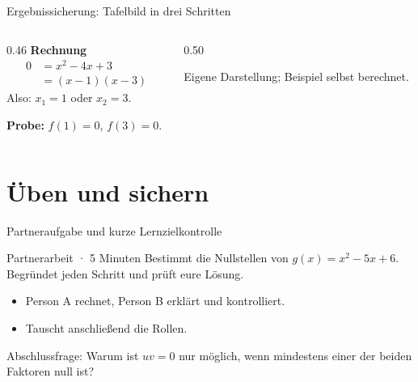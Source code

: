 \documentclass[aspectratio=169,11pt]{beamer}
\begin{document}
\begin{frame}{Ergebnissicherung: Tafelbild in drei Schritten}
  \begin{columns}[T,onlytextwidth]
    \begin{column}{0.46\textwidth}
      \textbf{Rechnung}
      \begin{align*}
        0 &= x^2-4x+3 \\
          &= (x-1)(x-3)
      \end{align*}
      \pause
      Also: \(x_1=1\) oder \(x_2=3\).
      \medskip

      \textbf{Probe:} \(f(1)=0\), \(f(3)=0\).
    \end{column}
    \begin{column}{0.50\textwidth}
      \scriptsize Eigene Darstellung; Beispiel selbst berechnet.
    \end{column}
  \end{columns}
\end{frame}

\section[Übung]{Üben und sichern}
\begin{frame}{Partneraufgabe und kurze Lernzielkontrolle}
  \begin{exampleblock}{Partnerarbeit · 5 Minuten}
    Bestimmt die Nullstellen von \(g(x)=x^2-5x+6\).
    Begründet jeden Schritt und prüft eure Lösung.
  \end{exampleblock}
  \begin{itemize}
    \item Person A rechnet, Person B erklärt und kontrolliert.
    \item Tauscht anschließend die Rollen.
  \end{itemize}
  \alert{Abschlussfrage:} Warum ist \(uv=0\) nur möglich, wenn mindestens
  einer der beiden Faktoren null ist?
\end{frame}
\end{document}
